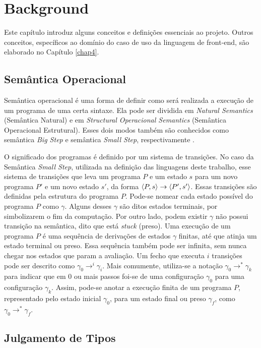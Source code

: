 \chapter{Background}

Este capítulo introduz alguns conceitos e definições essenciais ao projeto. 
Outros conceitos, específicos ao domínio do caso de uso da linguagem de front-end,
são elaborado no Capítulo \ref{chap4}. 

\section{Semântica Operacional}

Semântica operacional é uma forma de definir como será realizada a execução de um programa de uma certa sintaxe. Ela pode ser dividida em \emph{Natural Semantics} (Semântica Natural) e em \emph{Structural Operacional Semantics} (Semântica Operacional Estrutural). Esses dois modos também são conhecidos como semântica \emph{Big Step} e semântica \emph{Small Step}, respectivamente \cite{NIELSON}.

O significado dos programas é definido por um sistema de transições. No caso da Semântica \emph{Small Step}, utilizada na definição das linguagens deste trabalho, esse sistema de transições que leva um programa $P$ e um estado $s$ para um novo programa $P'$ e um novo estado $s'$, da forma $\langle P, s \rangle \to \langle P', s' \rangle$. Essas transições são definidas pela estrutura do programa $P$. Pode-se nomear cada estado possível do programa $P$ como $\gamma$. Alguns desses $\gamma$ são ditos estados terminais, por simbolizarem o fim da computação. Por outro lado, podem existir $\gamma$ não possui transição na semântica, dito que está \emph{stuck} (preso). Uma execução de um programa $P$ é uma sequência de derivações de estados $\gamma$ finitas, até que atinja um estado terminal ou preso. Essa sequência também pode ser infinita, sem nunca chegar nos estados que param a avaliação. Um fecho que executa $i$ transições pode ser descrito como $\gamma_0 \to^i \gamma_i$. Mais comumente, utiliza-se a notação $\gamma_0 \to^* \gamma_k$ para indicar que em 0 ou mais passos foi-se de uma configuração $\gamma_0$ para uma configuração $\gamma_k$. Assim, pode-se anotar a execução finita de um programa $P$, representado pelo estado inicial $\gamma_0$, para um estado final ou preso $\gamma_f$, como $\gamma_0 \to^* \gamma_f$.

\section{Julgamento de Tipos}

